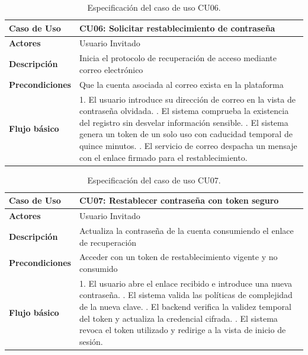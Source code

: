 \begin{table}[H]
\centering
\begin{tabular}{|p{3.1cm}|p{10.9cm}|}
\hline
\textbf{Caso de Uso} & \textbf{CU06: Solicitar restablecimiento de contraseña} \\ \hline
\textbf{Actores} & Usuario Invitado \\ \hline
\textbf{Descripción} & Inicia el protocolo de recuperación de acceso mediante correo electrónico \\ \hline
\textbf{Precondiciones} & Que la cuenta asociada al correo exista en la plataforma \\ \hline
\textbf{Flujo básico} & 
1. El usuario introduce su dirección de correo en la vista de contraseña olvidada. \newline
2. El sistema comprueba la existencia del registro sin desvelar información sensible. \newline
3. El sistema genera un token de un solo uso con caducidad temporal de quince minutos. \newline
4. El servicio de correo despacha un mensaje con el enlace firmado para el restablecimiento. \\ \hline
\end{tabular}
\caption{Especificación del caso de uso CU06.}
\label{tab:cu06}
\end{table}

\begin{table}[H]
\centering
\begin{tabular}{|p{3.1cm}|p{10.9cm}|}
\hline
\textbf{Caso de Uso} & \textbf{CU07: Restablecer contraseña con token seguro} \\ \hline
\textbf{Actores} & Usuario Invitado \\ \hline
\textbf{Descripción} & Actualiza la contraseña de la cuenta consumiendo el enlace de recuperación \\ \hline
\textbf{Precondiciones} & Acceder con un token de restablecimiento vigente y no consumido \\ \hline
\textbf{Flujo básico} & 
1. El usuario abre el enlace recibido e introduce una nueva contraseña. \newline
2. El sistema valida las políticas de complejidad de la nueva clave. \newline
3. El backend verifica la validez temporal del token y actualiza la credencial cifrada. \newline
4. El sistema revoca el token utilizado y redirige a la vista de inicio de sesión. \\ \hline
\end{tabular}
\caption{Especificación del caso de uso CU07.}
\label{tab:cu07}
\end{table}

